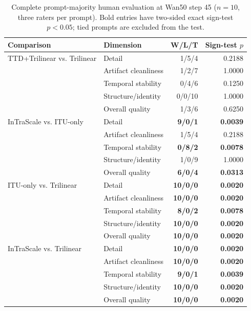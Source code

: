 \documentclass[letterpaper]{article}
\begin{document}
\begin{table}[t]
  \centering
  \small
  \setlength{\tabcolsep}{5pt}
  \begin{tabular}{llrr}
    \toprule
    Comparison & Dimension & W/L/T & Sign-test \(p\) \\
    \midrule
    TTD+Trilinear vs. Trilinear
      & Detail & 1/5/4 & 0.2188 \\
      & Artifact cleanliness & 1/2/7 & 1.0000 \\
      & Temporal stability & 0/4/6 & 0.1250 \\
      & Structure/identity & 0/0/10 & 1.0000 \\
      & Overall quality & 1/3/6 & 0.6250 \\
    \addlinespace
    InTraScale vs. ITU-only
      & Detail & \textbf{9/0/1} & \textbf{0.0039} \\
      & Artifact cleanliness & 1/5/4 & 0.2188 \\
      & Temporal stability & \textbf{0/8/2} & \textbf{0.0078} \\
      & Structure/identity & 1/0/9 & 1.0000 \\
      & Overall quality & \textbf{6/0/4} & \textbf{0.0313} \\
    \addlinespace
    ITU-only vs. Trilinear
      & Detail & \textbf{10/0/0} & \textbf{0.0020} \\
      & Artifact cleanliness & \textbf{10/0/0} & \textbf{0.0020} \\
      & Temporal stability & \textbf{8/0/2} & \textbf{0.0078} \\
      & Structure/identity & \textbf{10/0/0} & \textbf{0.0020} \\
      & Overall quality & \textbf{10/0/0} & \textbf{0.0020} \\
    \addlinespace
    InTraScale vs. Trilinear
      & Detail & \textbf{10/0/0} & \textbf{0.0020} \\
      & Artifact cleanliness & \textbf{10/0/0} & \textbf{0.0020} \\
      & Temporal stability & \textbf{9/0/1} & \textbf{0.0039} \\
      & Structure/identity & \textbf{10/0/0} & \textbf{0.0020} \\
      & Overall quality & \textbf{10/0/0} & \textbf{0.0020} \\
    \bottomrule
  \end{tabular}
  \caption{Complete prompt-majority human evaluation at Wan50 step 45
  (\(n=10\), three raters per prompt).  Bold entries have two-sided exact
  sign-test \(p<0.05\); tied prompts are excluded from the test.}
  \label{tab:human-majority}
\end{table}
\end{document}
